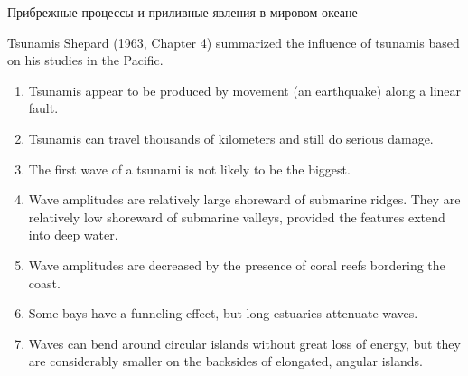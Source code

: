 \begin{chapter}{Прибрежные процессы и приливные явления в мировом океане}
\begin{section}{Tsunamis}
Shepard (1963, Chapter 4) summarized the influence of
tsunamis based on his studies in the
Pacific.
%
%
\begin{enumerate}
\item
Tsunamis appear to be produced by movement (an earthquake) along a
linear fault.
%

\item 
Tsunamis can travel thousands of kilometers and still do serious
damage.
%

\item
The first wave of a tsunami is not likely to be the biggest.
%

\item
Wave amplitudes are relatively large shoreward of submarine
ridges. They are relatively low shoreward of submarine valleys,
provided the features extend into deep water.
%

\item
Wave amplitudes are decreased by the presence of coral reefs bordering
the coast.
%

\item
Some bays have a funneling effect, but long estuaries attenuate waves.
%

\item
Waves can bend around circular islands without great loss of energy,
but they are considerably smaller on the backsides of elongated,
angular islands.
%
\end{enumerate}


\end{section}
\end{chapter}
